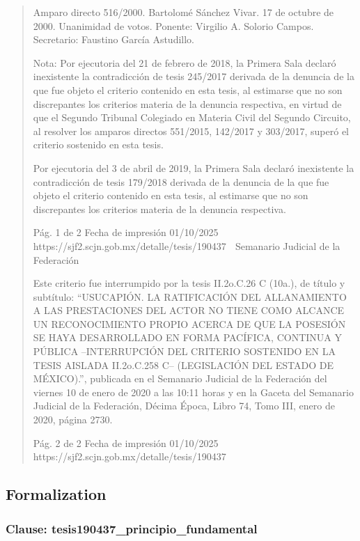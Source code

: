 \documentclass[11pt,a4paper]{article}
\begin{document}
\begin{quote}
Amparo directo 516/2000. Bartolomé Sánchez Vivar. 17 de octubre de 2000. Unanimidad de votos.
Ponente: Virgilio A. Solorio Campos. Secretario: Faustino García Astudillo.

Nota: Por ejecutoria del 21 de febrero de 2018, la Primera Sala declaró inexistente la contradicción
de tesis 245/2017 derivada de la denuncia de la que fue objeto el criterio contenido en esta tesis, al
estimarse que no son discrepantes los criterios materia de la denuncia respectiva, en virtud de que
el Segundo Tribunal Colegiado en Materia Civil del Segundo Circuito, al resolver los amparos
directos 551/2015, 142/2017 y 303/2017, superó el criterio sostenido en esta tesis.

Por ejecutoria del 3 de abril de 2019, la Primera Sala declaró inexistente la contradicción de tesis
179/2018 derivada de la denuncia de la que fue objeto el criterio contenido en esta tesis, al
estimarse que no son discrepantes los criterios materia de la denuncia respectiva.


                                             Pág. 1 de 2             Fecha de impresión 01/10/2025
  https://sjf2.scjn.gob.mx/detalle/tesis/190437
                                                  Semanario Judicial de la Federación

Este criterio fue interrumpido por la tesis II.2o.C.26 C (10a.), de título y subtítulo: “USUCAPIÓN. LA
RATIFICACIÓN DEL ALLANAMIENTO A LAS PRESTACIONES DEL ACTOR NO TIENE COMO
ALCANCE UN RECONOCIMIENTO PROPIO ACERCA DE QUE LA POSESIÓN SE HAYA
DESARROLLADO EN FORMA PACÍFICA, CONTINUA Y PÚBLICA –INTERRUPCIÓN DEL
CRITERIO SOSTENIDO EN LA TESIS AISLADA II.2o.C.258 C– (LEGISLACIÓN DEL ESTADO DE
MÉXICO).”, publicada en el Semanario Judicial de la Federación del viernes 10 de enero de 2020 a
las 10:11 horas y en la Gaceta del Semanario Judicial de la Federación, Décima Época, Libro 74,
Tomo III, enero de 2020, página 2730.




                                             Pág. 2 de 2             Fecha de impresión 01/10/2025
  https://sjf2.scjn.gob.mx/detalle/tesis/190437

\end{quote}

\subsection{Formalization}

\subsubsection{Clause: tesis190437\_principio\_fundamental}
\end{document}
